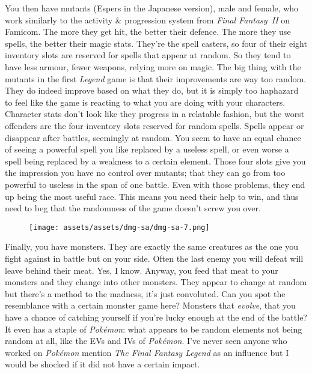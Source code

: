 \documentclass{book}
\begin{document}
You then have mutants (Espers in the Japanese version), male and female, who work similarly to the activity \& progression system from \emph{Final Fantasy~II} on Famicom. The more they get hit, the better their defence. The more they use spells, the better their magic stats. They’re the spell casters, so four of their eight inventory slots are reserved for spells that appear at random. So they tend to have less armour, fewer weapons, relying more on magic. The big thing with the mutants in the first \emph{Legend} game is that their improvements are way too random. They do indeed improve based on what they do, but it is simply too haphazard to feel like the game is reacting to what you are doing with your characters. Character stats don’t look like they progress in a relatable fashion, but the worst offenders are the four inventory slots reserved for random spells. Spells appear or disappear after battles, seemingly at random. You seem to have an equal chance of seeing a powerful spell you like replaced by a useless spell, or even worse a spell being replaced by a weakness to a certain element. Those four slots give you the impression you have no control over mutants; that they can go from too powerful to useless in the span of one battle. Even with those problems, they end up being the most useful race. This means you need their help to win, and thus need to beg that the randomness of the game doesn’t screw you over.

\begin{figure}[hbt]
\vskip 10pt
\centering \texttt{[image: assets/assets/dmg-sa/dmg-sa-7.png]}
\vskip 6pt
\end{figure}
Finally, you have monsters. They are exactly the same creatures as the one you fight against in battle but on your side. Often the last enemy you will defeat will leave behind their meat. Yes, I know. Anyway, you feed that meat to your monsters and they change into other monsters. They appear to change at random but there’s a method to the madness, it’s just convoluted. Can you spot the resemblance with a certain monster game here? Monsters that \emph{evolve}, that you have a chance of catching yourself if you’re lucky enough at the end of the battle? It even has a staple of \emph{Pokémon}: what appears to be random elements not being random at all, like the EVs and IVs of \emph{Pokémon}. I’ve never seen anyone who worked on \emph{Pokémon} mention \emph{The Final Fantasy Legend} as an influence but I would be shocked if it did not have a certain impact.
\end{document}
